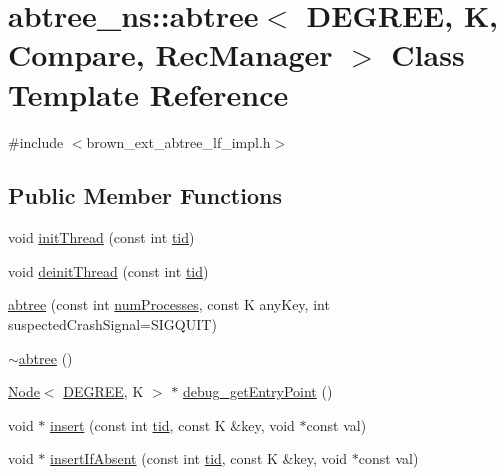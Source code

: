 \hypertarget{classabtree__ns_1_1abtree}{}\section{abtree\+\_\+ns\+:\+:abtree$<$ D\+E\+G\+R\+EE, K, Compare, Rec\+Manager $>$ Class Template Reference}
\label{classabtree__ns_1_1abtree}


{\ttfamily \#include $<$brown\+\_\+ext\+\_\+abtree\+\_\+lf\+\_\+impl.\+h$>$}

\subsection*{Public Member Functions}
\begin{DoxyCompactItemize}
\item 
void \hyperlink{classabtree__ns_1_1abtree_a04d2955852cc93867ec9ffcd40d27883}{init\+Thread} (const int \hyperlink{microbench_2main_8cpp_a9ca9869868fe7e7a38a921cc7de4103f}{tid})
\item 
void \hyperlink{classabtree__ns_1_1abtree_aa88728d950187868d9b97cb65dcb5e83}{deinit\+Thread} (const int \hyperlink{microbench_2main_8cpp_a9ca9869868fe7e7a38a921cc7de4103f}{tid})
\item 
\hyperlink{classabtree__ns_1_1abtree_a1b7319a8a3f68d6106c2e011713201a7}{abtree} (const int \hyperlink{testing_8cpp_aa085812188e21ede75351d88b9b2c30d}{num\+Processes}, const K any\+Key, int suspected\+Crash\+Signal=S\+I\+G\+Q\+U\+IT)
\item 
\hyperlink{classabtree__ns_1_1abtree_a083203a9c7d98c33b08b034a83f40e0e}{$\sim$abtree} ()
\item 
\hyperlink{structabtree__ns_1_1Node}{Node}$<$ \hyperlink{brown__sigouin__abtree__kcas_2adapter_8h_a5d88b17d70c985f2f2b8e987037fd6dd}{D\+E\+G\+R\+EE}, K $>$ $\ast$ \hyperlink{classabtree__ns_1_1abtree_a71f2fd9b35b978c49e77f9e32c3436f3}{debug\+\_\+get\+Entry\+Point} ()
\item 
void $\ast$ \hyperlink{classabtree__ns_1_1abtree_a951a74f5690dbbaf55ab121fa3b5c6ca}{insert} (const int \hyperlink{microbench_2main_8cpp_a9ca9869868fe7e7a38a921cc7de4103f}{tid}, const K \&key, void $\ast$const val)
\item 
void $\ast$ \hyperlink{classabtree__ns_1_1abtree_a560964a145c9c4d8525486aa9dda48d5}{insert\+If\+Absent} (const int \hyperlink{microbench_2main_8cpp_a9ca9869868fe7e7a38a921cc7de4103f}{tid}, const K \&key, void $\ast$const val)

\end{DoxyCompactItemize}
